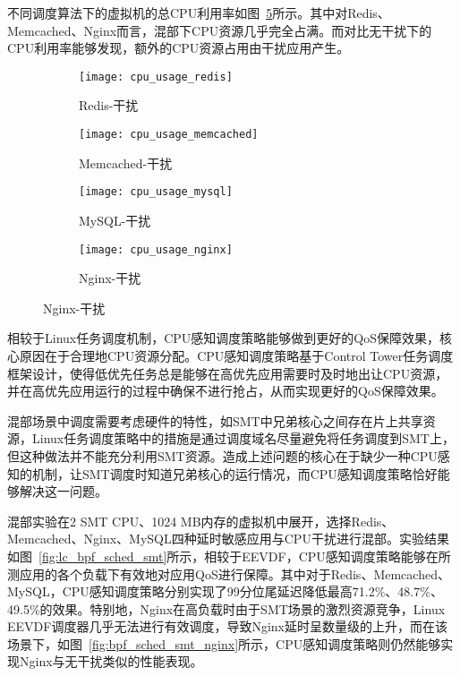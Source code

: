 不同调度算法下的虚拟机的总CPU利用率如图~\ref{fig:cpu_usage}所示。其中对Redis、Memcached、Nginx而言，混部下CPU资源几乎完全占满。而对比无干扰下的CPU利用率能够发现，额外的CPU资源占用由干扰应用产生。

\begin{figure}[H]
    \centering
    \begin{subfigure}[b]{0.33\textwidth}
        \texttt{[image: cpu\_usage\_redis]}
        \caption{Redis-干扰}
        \label{fig:cpu_usage_redis}
    \end{subfigure}
    \begin{subfigure}[b]{0.33\textwidth}
        \texttt{[image: cpu\_usage\_memcached]}
        \caption{Memcached-干扰}
        \label{fig:cpu_usage_memcached}
    \end{subfigure}
    \begin{subfigure}[b]{0.33\textwidth}
        \texttt{[image: cpu\_usage\_mysql]}
        \caption{MySQL-干扰}
        \label{fig:cpu_usage_mysql}
    \end{subfigure}
    \begin{subfigure}[b]{0.33\textwidth}
        \texttt{[image: cpu\_usage\_nginx]}
        \caption{Nginx-干扰}
        \label{fig:cpu_usage_nginx}
    \end{subfigure}
\label{fig:cpu_usage}
\end{figure}

相较于Linux任务调度机制，CPU感知调度策略能够做到更好的QoS保障效果，核心原因在于合理地CPU资源分配。CPU感知调度策略基于Control Tower任务调度框架设计，使得低优先任务总是能够在高优先应用需要时及时地出让CPU资源，并在高优先应用运行的过程中确保不进行抢占，从而实现更好的QoS保障效果。

混部场景中调度需要考虑硬件的特性，如SMT中兄弟核心之间存在片上共享资源，Linux任务调度策略中的措施是通过调度域名尽量避免将任务调度到SMT上，但这种做法并不能充分利用SMT资源。造成上述问题的核心在于缺少一种CPU感知的机制，让SMT调度时知道兄弟核心的运行情况，而CPU感知调度策略恰好能够解决这一问题。

混部实验在2 SMT CPU、1024 MB内存的虚拟机中展开，选择Redis、Memcached、Nginx、MySQL四种延时敏感应用与CPU干扰进行混部。实验结果如图~\ref{fig:lc_bpf_sched_smt}所示，相较于EEVDF，CPU感知调度策略能够在所测应用的各个负载下有效地对应用QoS进行保障。其中对于Redis、Memcached、MySQL，CPU感知调度策略分别实现了99分位尾延迟降低最高71.2\%、48.7\%、49.5\%的效果。特别地，Nginx在高负载时由于SMT场景的激烈资源竞争，Linux EEVDF调度器几乎无法进行有效调度，导致Nginx延时呈数量级的上升，而在该场景下，如图~\ref{fig:bpf_sched_smt_nginx}所示，CPU感知调度策略则仍然能够实现Nginx与无干扰类似的性能表现。

